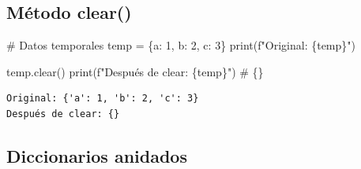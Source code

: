 \documentclass[
  doc,
  floatsintext,
  longtable,
  a4paper,
  nolmodern,
  notxfonts,
  notimes,
  12pt,
  colorlinks=true,linkcolor=blue,citecolor=blue,urlcolor=blue]{apa7}
\newenvironment{Shaded}{\begin{snugshade}}{\end{snugshade}}
\newcommand{\BuiltInTok}[1]{\textcolor[rgb]{0.00,0.23,0.31}{#1}}
\newcommand{\CommentTok}[1]{\textcolor[rgb]{0.37,0.37,0.37}{#1}}
\newcommand{\DecValTok}[1]{\textcolor[rgb]{0.68,0.00,0.00}{#1}}
\newcommand{\NormalTok}[1]{\textcolor[rgb]{0.00,0.23,0.31}{#1}}
\newcommand{\OperatorTok}[1]{\textcolor[rgb]{0.37,0.37,0.37}{#1}}
\newcommand{\SpecialCharTok}[1]{\textcolor[rgb]{0.37,0.37,0.37}{#1}}
\newcommand{\SpecialStringTok}[1]{\textcolor[rgb]{0.13,0.47,0.30}{#1}}
\newcommand{\StringTok}[1]{\textcolor[rgb]{0.13,0.47,0.30}{#1}}
\begin{document}
\subsection{Método clear()}\label{muxe9todo-clear}

\begin{Shaded}
\begin{Highlighting}[]
\CommentTok{\# Datos temporales}
\NormalTok{temp }\OperatorTok{=}\NormalTok{ \{}\StringTok{\textquotesingle{}a\textquotesingle{}}\NormalTok{: }\DecValTok{1}\NormalTok{, }\StringTok{\textquotesingle{}b\textquotesingle{}}\NormalTok{: }\DecValTok{2}\NormalTok{, }\StringTok{\textquotesingle{}c\textquotesingle{}}\NormalTok{: }\DecValTok{3}\NormalTok{\}}
\BuiltInTok{print}\NormalTok{(}\SpecialStringTok{f"Original: }\SpecialCharTok{\{}\NormalTok{temp}\SpecialCharTok{\}}\SpecialStringTok{"}\NormalTok{)}

\NormalTok{temp.clear()}
\BuiltInTok{print}\NormalTok{(}\SpecialStringTok{f"Después de clear: }\SpecialCharTok{\{}\NormalTok{temp}\SpecialCharTok{\}}\SpecialStringTok{"}\NormalTok{)  }\CommentTok{\# \{\}}
\end{Highlighting}
\end{Shaded}

\begin{verbatim}
Original: {'a': 1, 'b': 2, 'c': 3}
Después de clear: {}
\end{verbatim}

\subsection{Diccionarios anidados}\label{diccionarios-anidados}
\end{document}
